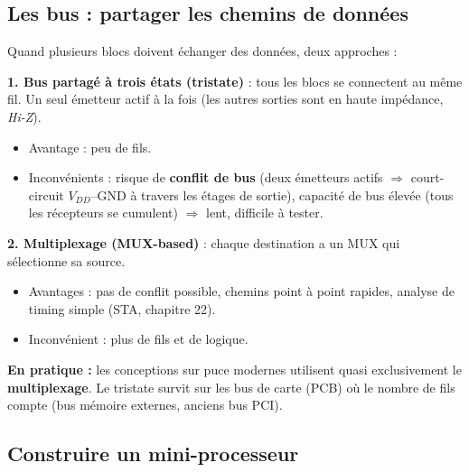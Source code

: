\documentclass[12pt,a4paper,twoside]{book}
\begin{document}
\subsection{Les bus : partager les chemins de données}

\begin{formule}
Quand plusieurs blocs doivent échanger des données, deux approches :

\textbf{1. Bus partagé à trois états (tristate)} : tous les blocs se connectent au même fil. Un seul émetteur actif à la fois (les autres sorties sont en haute impédance, \textit{Hi-Z}).
\begin{itemize}[nosep]
\item Avantage : peu de fils.
\item Inconvénients : risque de \textbf{conflit de bus} (deux émetteurs actifs $\Rightarrow$ court-circuit $V_{DD}$--GND à travers les étages de sortie), capacité de bus élevée (tous les récepteurs se cumulent) $\Rightarrow$ lent, difficile à tester.
\end{itemize}

\textbf{2. Multiplexage (MUX-based)} : chaque destination a un MUX qui sélectionne sa source.
\begin{itemize}[nosep]
\item Avantages : pas de conflit possible, chemins point à point rapides, analyse de timing simple (STA, chapitre 22).
\item Inconvénient : plus de fils et de logique.
\end{itemize}

\textbf{En pratique :} les conceptions sur puce modernes utilisent quasi exclusivement le \textbf{multiplexage}. Le tristate survit sur les bus de carte (PCB) où le nombre de fils compte (bus mémoire externes, anciens bus PCI).
\end{formule}

\subsection{Construire un mini-processeur}
\end{document}

